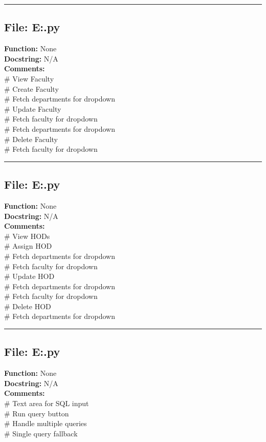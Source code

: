 {\hrule

\subsection*{File: E:\project\capstone\frontend\admin\faculty.py}
\textbf{Function:} None\\
\textbf{Docstring:} N/A\\
\textbf{Comments:}\\
# View Faculty\\
# Create Faculty\\
# Fetch departments for dropdown\\
# Update Faculty\\
# Fetch faculty for dropdown\\
# Fetch departments for dropdown\\
# Delete Faculty\\
# Fetch faculty for dropdown\\

\hrule

\subsection*{File: E:\project\capstone\frontend\admin\hod.py}
\textbf{Function:} None\\
\textbf{Docstring:} N/A\\
\textbf{Comments:}\\
# View HODs\\
# Assign HOD\\
# Fetch departments for dropdown\\
# Fetch faculty for dropdown\\
# Update HOD\\
# Fetch departments for dropdown\\
# Fetch faculty for dropdown\\
# Delete HOD\\
# Fetch departments for dropdown\\

\hrule

\subsection*{File: E:\project\capstone\frontend\admin\query.py}
\textbf{Function:} None\\
\textbf{Docstring:} N/A\\
\textbf{Comments:}\\
# Text area for SQL input\\
# Run query button\\
# Handle multiple queries\\
# Single query fallback\\

}
